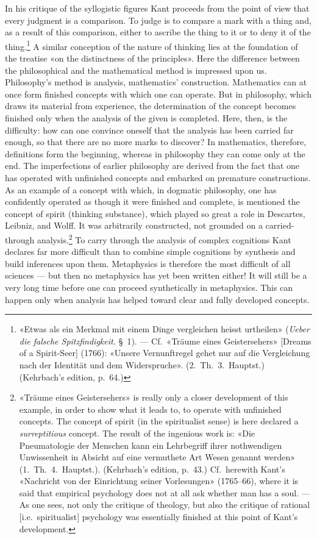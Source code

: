 \documentclass[12pt,a4paper]{article}
\newcommand{\opage}[1]{\marginnote{\footnotesize\textit{[#1]}}}
\begin{document}
In his critique of the syllogistic figures Kant proceeds from the point of
view that every judgment \opage{19}is a comparison. To judge is to compare a mark
with a thing and, as a result of this comparison, either to ascribe the
thing to it or to deny it of the thing.\footnote{«Etwas als ein Merkmal
mit einem Dinge vergleichen heisst urtheilen» (\textit{Ueber die falsche
Spitzfindigkeit.} §\ 1). --- Cf.\ «Träume eines Geistersehers» [Dreams of
a Spirit-Seer] (1766): «Unsere Vernunftregel gehet nur auf die
Vergleichung nach der Identität und dem Widerspruche». (2.\ Th.\ 3.\
Hauptst.) (Kehrbach's edition, p.\ 64.)} A similar conception of the
nature of thinking lies at the foundation of the treatise «on the
distinctness of the principles». Here the difference between the
philosophical and the mathematical method is impressed upon us.
Philosophy's method is analysis, mathematics' construction. Mathematics
can at once form finished concepts with which one can operate. But in
philosophy, which draws its material from experience, the determination of
the concept becomes finished only when the analysis of the given is
completed. Here, then, is the difficulty: how can one convince oneself
that the analysis has been carried far enough, so that there are no more
marks to discover? In mathematics, therefore, definitions form the
beginning, whereas in philosophy they can come only at the end. The
imperfections of earlier philosophy are derived from the fact that one has
operated with unfinished concepts and embarked on premature constructions.
As an example of a concept with which, in dogmatic philosophy, one has
confidently operated as though it were finished and complete, is mentioned
the concept of spirit (thinking substance), which played so great a role
in Descartes, Leibniz, and Wolff. It was arbitrarily constructed, not
grounded on a carried-through analysis.\footnote{«Träume eines
Geistersehers» is really only a closer development of this example, in
order to show what it leads to, to operate with unfinished concepts. The
concept of spirit (in the spiritualist sense) is here declared a
\emph{surreptitious} concept. The result of the ingenious work is: «Die
Pneumatologie der Menschen kann ein Lehrbegriff ihrer nothwendigen
Unwissenheit in Absicht auf eine vermuthete Art Wesen genannt werden»
(1.\ Th.\ 4.\ Hauptst.). (Kehrbach's edition, p.\ 43.) Cf.\ herewith
Kant's «Nachricht von der Einrichtung seiner Vorlesungen» (1765--66),
where it is said that empirical psychology does not at all ask whether man
has a soul. --- As one sees, not only the critique of theology, but also
the critique of rational [i.e.\ spiritualist] psychology was essentially
finished at this point of Kant's development.} To carry through the
analysis of complex cognitions Kant declares far more difficult than to
combine simple cognitions by synthesis and build inferences upon them.
Metaphysics is therefore the most difficult of all sciences --- but then
no metaphysics has yet been written either! It will still be a very long
time before one can proceed synthetically in metaphysics. This can happen
only when analysis has helped toward clear and fully developed concepts.
\end{document}
